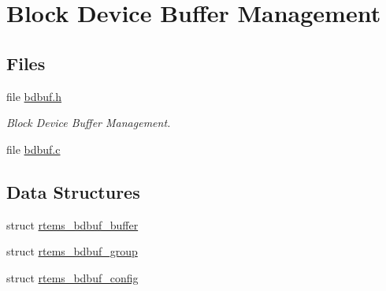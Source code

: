 \hypertarget{group__rtems__bdbuf}{}\section{Block Device Buffer Management}
\label{group__rtems__bdbuf}
\subsection*{Files}
\begin{DoxyCompactItemize}
\item 
file \mbox{\hyperlink{bdbuf_8h}{bdbuf.\+h}}
\begin{DoxyCompactList}\small\item\em Block Device Buffer Management. \end{DoxyCompactList}\item 
file \mbox{\hyperlink{bdbuf_8c}{bdbuf.\+c}}
\end{DoxyCompactItemize}
\subsection*{Data Structures}
\begin{DoxyCompactItemize}
\item 
struct \mbox{\hyperlink{structrtems__bdbuf__buffer}{rtems\+\_\+bdbuf\+\_\+buffer}}
\item 
struct \mbox{\hyperlink{structrtems__bdbuf__group}{rtems\+\_\+bdbuf\+\_\+group}}
\item 
struct \mbox{\hyperlink{structrtems__bdbuf__config}{rtems\+\_\+bdbuf\+\_\+config}}
\end{DoxyCompactItemize}
